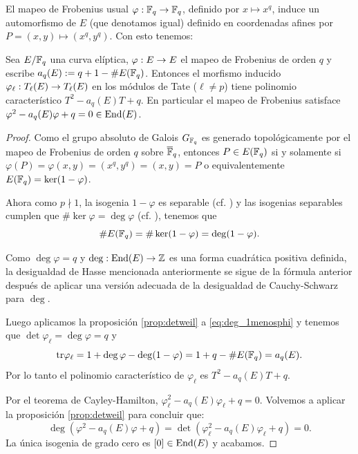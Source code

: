 El mapeo de Frobenius usual $\varphi:\mathbb{F}_q\rightarrow\mathbb{F}_q$, definido por $x\mapsto x^q$, induce un
automorfismo de $E$ (que denotamos igual) definido en coordenadas afines por
$P=(x,y)\mapsto (x^q,y^q)$. Con esto tenemos:

\begin{thm}\label{thm:traza_frobenius}
  Sea $E/\mathbb{F}_q$ una curva el\'iptica, $\varphi:E\rightarrow E$ el mapeo de Frobenius de orden $q$ y
  escribe $a_q(E):=q+1-\# E(\mathbb{F}_q)$. Entonces el morfismo inducido
  $\varphi_{\ell}:T_{\ell}(E)\rightarrow T_{\ell}(E)$ en los m\'odulos de Tate ($\ell\neq p$) tiene polinomio
  caracter\'istico $T^2-a_q(E)T+q$. En particular el mapeo de Frobenius satisface
  $\varphi^2-a_q(E)\varphi+q=0\in\mathrm{End}(E)$.
\end{thm}
\begin{proof}
  Como el grupo absoluto de Galois $G_{\mathbb{F}_q}$ es generado topol\'ogicamente por el mapeo de
  Frobenius de orden $q$ sobre $\overline{\mathbb{F}}_q$, entonces $P\in E(\mathbb{F}_q)$ si y solamente si
  $\varphi(P)=\varphi(x,y)=(x^q,y^q)=(x,y)=P$ o equivalentemente $E(\mathbb{F}_q)=\ker(1-\varphi)$.

  Ahora como $p\nmid1$, la isogenia $1-\varphi$ es separable (cf.
  \cite[cap\'itulo III, corolario 5.5]{SilvermanTAOEC}) y las isogenias separables cumplen
  que $\#\ker\varphi=\deg\varphi$ (cf. \cite[cap\'itulo III, teorema 4.10.c]{SilvermanTAOEC}),
  tenemos que
  \begin{equation}\label{eq:deg_1menosphi}
    \# E(\mathbb{F}_q)=\#\ker(1-\varphi)=\deg(1-\varphi).
  \end{equation}
  \begin{nota}
    Como $\deg\varphi=q$ y $\deg:\mathrm{End}(E)\rightarrow\mathbb{Z}$ es una forma cuadr\'atica positiva definida, la
    desigualdad de Hasse mencionada anteriormente se sigue de la f\'ormula anterior despu\'es de
    aplicar una versi\'on adecuada de la desigualdad de Cauchy-Schwarz para $\deg$.
  \end{nota}

  Luego aplicamos la proposici\'on \ref{prop:detweil} a \ref{eq:deg_1menosphi} y tenemos que
  $\det\varphi_{\ell}=\deg\varphi=q$ y
  \[
    \mathrm{tr}\varphi_{\ell}=1+\deg\varphi-\deg(1-\varphi)=1+q-\# E(\mathbb{F}_q)=a_q(E).
  \]
  Por lo tanto el polinomio caracter\'istico de $\varphi_{\ell}$ es $T^2-a_q(E)T+q$.

  Por el teorema de Cayley-Hamilton, $\varphi_{\ell}^2-a_q(E)\varphi_{\ell}+q=0$. Volvemos a aplicar
  la proposici\'on \ref{prop:detweil} para concluir que:
  \[
    \deg(\varphi^2-a_q(E)\varphi+q)=\det(\varphi_{\ell}^2-a_q(E)\varphi_{\ell}+q)=0.
  \]
  La \'unica isogenia de grado cero es $[0]\in\mathrm{End}(E)$ y acabamos.
\end{proof}

